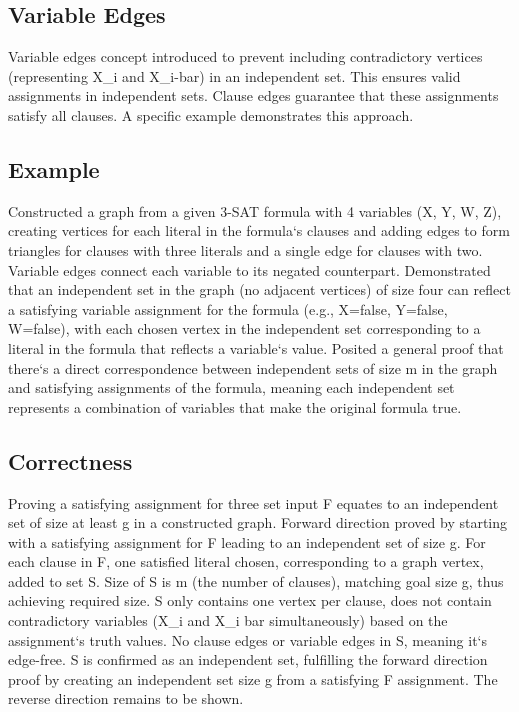 \subsection*{Variable Edges}
Variable edges concept introduced to prevent including contradictory vertices (representing X\_i and X\_i-bar) in an independent set.
This ensures valid assignments in independent sets.
Clause edges guarantee that these assignments satisfy all clauses.
A specific example demonstrates this approach.

\subsection*{Example}
Constructed a graph from a given 3-SAT formula with 4 variables (X, Y, W, Z), creating vertices for each literal in the formula`s clauses and adding edges to form triangles for clauses with three literals and a single edge for clauses with two.
Variable edges connect each variable to its negated counterpart.
Demonstrated that an independent set in the graph (no adjacent vertices) of size four can reflect a satisfying variable assignment for the formula (e.g., X=false, Y=false, W=false), with each chosen vertex in the independent set corresponding to a literal in the formula that reflects a variable`s value.
Posited a general proof that there`s a direct correspondence between independent sets of size m in the graph and satisfying assignments of the formula, meaning each independent set represents a combination of variables that make the original formula true.

\subsection*{Correctness}
Proving a satisfying assignment for three set input F equates to an independent set of size at least g in a constructed graph.
Forward direction proved by starting with a satisfying assignment for F leading to an independent set of size g.
For each clause in F, one satisfied literal chosen, corresponding to a graph vertex, added to set S\@.
Size of S is m (the number of clauses), matching goal size g, thus achieving required size.
S only contains one vertex per clause, does not contain contradictory variables (X\_i and X\_i bar simultaneously) based on the assignment`s truth values.
No clause edges or variable edges in S, meaning it`s edge-free.
S is confirmed as an independent set, fulfilling the forward direction proof by creating an independent set size g from a satisfying F assignment.
The reverse direction remains to be shown.

